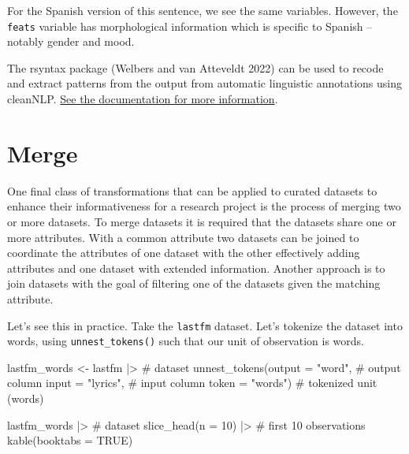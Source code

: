 \documentclass[
  letterpaper,
]{latex/krantz}
\newenvironment{Shaded}{\begin{snugshade}}{\end{snugshade}}
\newcommand{\AttributeTok}[1]{\textcolor[rgb]{0.40,0.45,0.13}{#1}}
\newcommand{\CommentTok}[1]{\textcolor[rgb]{0.37,0.37,0.37}{#1}}
\newcommand{\ConstantTok}[1]{\textcolor[rgb]{0.56,0.35,0.01}{#1}}
\newcommand{\DecValTok}[1]{\textcolor[rgb]{0.68,0.00,0.00}{#1}}
\newcommand{\FunctionTok}[1]{\textcolor[rgb]{0.28,0.35,0.67}{#1}}
\newcommand{\NormalTok}[1]{\textcolor[rgb]{0.00,0.23,0.31}{#1}}
\newcommand{\OtherTok}[1]{\textcolor[rgb]{0.00,0.23,0.31}{#1}}
\newcommand{\SpecialCharTok}[1]{\textcolor[rgb]{0.37,0.37,0.37}{#1}}
\newcommand{\StringTok}[1]{\textcolor[rgb]{0.13,0.47,0.30}{#1}}
\begin{document}
For the Spanish version of this sentence, we see the same variables.
However, the \texttt{feats} variable has morphological information which
is specific to Spanish --notably gender and mood.

\begin{tcolorbox}[enhanced jigsaw, toprule=.15mm, bottomtitle=1mm, coltitle=black, title=\textcolor{quarto-callout-warning-color}{\faExclamationTriangle}\hspace{0.5em}{Tip}, left=2mm, colframe=quarto-callout-warning-color-frame, bottomrule=.15mm, colbacktitle=quarto-callout-warning-color!10!white, leftrule=.75mm, colback=white, titlerule=0mm, breakable, toptitle=1mm, opacityback=0, arc=.35mm, rightrule=.15mm, opacitybacktitle=0.6]

The rsyntax package (Welbers and van Atteveldt 2022) can be used to
recode and extract patterns from the output from automatic linguistic
annotations using cleanNLP.
\href{https://github.com/vanatteveldt/rsyntax}{See the documentation for
more information}.

\end{tcolorbox}

\hypertarget{merge}{%
\section{Merge}\label{merge}}

One final class of transformations that can be applied to curated
datasets to enhance their informativeness for a research project is the
process of merging two or more datasets. To merge datasets it is
required that the datasets share one or more attributes. With a common
attribute two datasets can be joined to coordinate the attributes of one
dataset with the other effectively adding attributes and one dataset
with extended information. Another approach is to join datasets with the
goal of filtering one of the datasets given the matching attribute.

Let's see this in practice. Take the \texttt{lastfm} dataset. Let's
tokenize the dataset into words, using \texttt{unnest\_tokens()} such
that our unit of observation is words.

\begin{Shaded}
\begin{Highlighting}[]
\NormalTok{lastfm\_words }\OtherTok{\textless{}{-}} 
\NormalTok{  lastfm }\SpecialCharTok{|\textgreater{}} \CommentTok{\# dataset}
  \FunctionTok{unnest\_tokens}\NormalTok{(}\AttributeTok{output =} \StringTok{"word"}\NormalTok{, }\CommentTok{\# output column}
                \AttributeTok{input =} \StringTok{"lyrics"}\NormalTok{, }\CommentTok{\# input column}
                \AttributeTok{token =} \StringTok{"words"}\NormalTok{) }\CommentTok{\# tokenized unit (words)}

\NormalTok{lastfm\_words }\SpecialCharTok{|\textgreater{}} \CommentTok{\# dataset}
  \FunctionTok{slice\_head}\NormalTok{(}\AttributeTok{n =} \DecValTok{10}\NormalTok{) }\SpecialCharTok{|\textgreater{}} \CommentTok{\# first 10 observations}
  \FunctionTok{kable}\NormalTok{(}\AttributeTok{booktabs =} \ConstantTok{TRUE}\NormalTok{)}
\end{Highlighting}
\end{Shaded}
\end{document}
